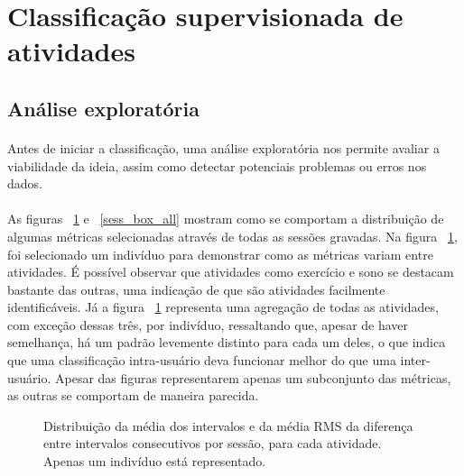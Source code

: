         
    \section{Classificação supervisionada de atividades}
    \label{classif}
    
        \subsection{Análise exploratória}
            
            \paragraph{} Antes de iniciar a classificação, uma análise exploratória nos permite avaliar a viabilidade da ideia, assim como detectar potenciais problemas ou erros nos dados. 
            \paragraph{}As figuras ~\ref{sess_box_ronald} e ~\ref{sess_box_all} mostram como se comportam a distribuição de algumas métricas selecionadas através de todas as sessões gravadas. Na figura ~\ref{sess_box_ronald}, foi selecionado um indivíduo para demonstrar como as métricas variam entre atividades. É possível observar que atividades como exercício e sono se destacam bastante das outras, uma indicação de que são atividades facilmente identificáveis. Já a figura ~\ref{sess_box_ronald} representa uma agregação de todas as atividades, com exceção dessas três, por indivíduo, ressaltando que, apesar de haver semelhança, há um padrão levemente distinto para cada um deles, o que indica que uma classificação intra-usuário deva funcionar melhor do que uma inter-usuário. Apesar das figuras representarem apenas um subconjunto das métricas, as outras se comportam de maneira parecida.
      
      
            \begin{figure}[h!]
                \centering
                \caption{Distribuição da média dos intervalos e da média RMS da diferença entre intervalos consecutivos por sessão, para cada atividade. Apenas um indivíduo está representado.}
                \label{sess_box_ronald}
            \end{figure}

